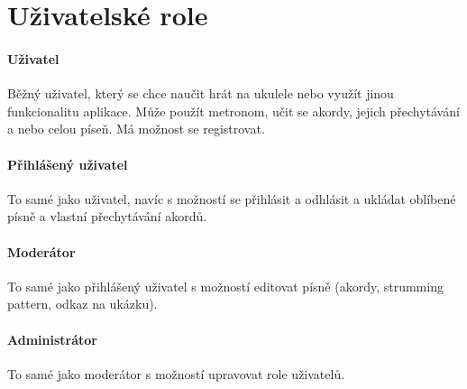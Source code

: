 \section{Uživatelské role}
\label{sc:user_roles}

\noindent \begin{minipage}{\textwidth}
    \paragraph{Uživatel}
    \begin{smallindent}{}
        Běžný uživatel, který se chce naučit hrát na ukulele nebo využít jinou funkcionalitu aplikace. Může použít metronom, učit se akordy, jejich přechytávání a nebo celou píseň.
        Má možnost se registrovat.
    \end{smallindent}
\end{minipage}


\noindent \begin{minipage}{\textwidth}
    \paragraph{Přihlášený uživatel}
    \begin{smallindent}{}
        To samé jako uživatel, navíc s možností se přihlásit a odhlásit a ukládat oblíbené písně a vlastní přechytávání akordů.
    \end{smallindent}
\end{minipage}

\noindent \begin{minipage}{\textwidth}
    \paragraph{Moderátor}
    \begin{smallindent}{}
        To samé jako přihlášený uživatel s možností editovat písně (akordy, strumming pattern, odkaz na ukázku).
    \end{smallindent}
\end{minipage}

\noindent \begin{minipage}{\textwidth}
    \paragraph{Administrátor}
    \begin{smallindent}{}
        To samé jako moderátor s možností upravovat role uživatelů.
    \end{smallindent}
\end{minipage}